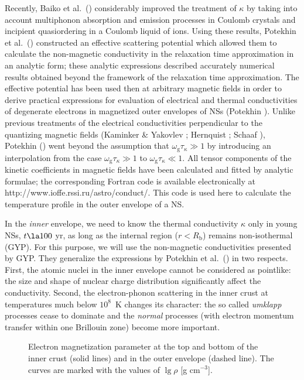 \documentclass{aa}
\begin{document}
Recently, Baiko et al.\ (\cite{baiko-ea98})
considerably improved the
treatment of $\kappa$ by taking into account
multiphonon absorption and emission processes
in Coulomb crystals and
incipient quasiordering in a Coulomb liquid of ions.
Using these results, Potekhin et al.\ (\cite{pbhy99})
constructed an effective scattering potential
which allowed them to calculate the non-magnetic
conductivity in the relaxation time approximation
in an analytic form; these analytic expressions
described accurately numerical results obtained beyond
the framework of the relaxation time approximation.
The effective potential has been
used then at arbitrary magnetic fields in order to derive
practical expressions for evaluation of
electrical and thermal conductivities
of degenerate electrons
in magnetized outer envelopes of NSs 
(Potekhin \cite{P99}).
Unlike previous treatments of the electrical conductivities
perpendicular to the quantizing magnetic fields
(Kaminker \& Yakovlev \cite{kayak}; Hernquist \cite{hern84};
Schaaf \cite{schaaf88}), Potekhin (\cite{P99})
went beyond the assumption that $\omega_\mathrm{g}\tau_\kappa\gg1$
by introducing an interpolation from the case
 $\omega_\mathrm{g}\tau_\kappa \gg 1$ 
to $\omega_\mathrm{g}\tau_\kappa \ll 1$.
All tensor components of the kinetic coefficients in magnetic fields
have been calculated and fitted by analytic formulae; 
the corresponding Fortran
code is available electronically at
http://www.ioffe.rssi.ru/astro/conduct/.
This code is used here to calculate the temperature profile
in the outer envelope of a NS.

In the \emph{inner} envelope, we need to know 
the thermal conductivity $\kappa$ only in young NSs,
$t \la 100$ yr, as long as the internal region ($r<R_\mathrm{b}$)
remains non-isothermal (GYP).
For this purpose, we will use
the non-magnetic 
conductivities presented by GYP.
They generalize the expressions
by Potekhin et al.\ (\cite{pbhy99}) in two respects.
First, the atomic nuclei in the inner envelope
cannot be considered as pointlike:
the size and shape of nuclear charge distribution
significantly affect the conductivity.
Second, the electron-phonon 
scattering in the inner crust at temperatures much below $10^8$~K
changes its character: the so called {\em umklapp\/} processes cease to
dominate and the {\em normal\/} processes (with electron momentum
transfer within one Brillouin zone) become more important.

\begin{figure}
\centering
\epsfxsize=8cm
\caption{Electron magnetization parameter
at the top and bottom of the inner crust
(solid lines) and in the outer envelope (dashed line).
The curves are marked with the values of $\lg \rho$
[g cm$^{-3}$].
}
\label{fig-relaxt}
\end{figure}
\end{document}
